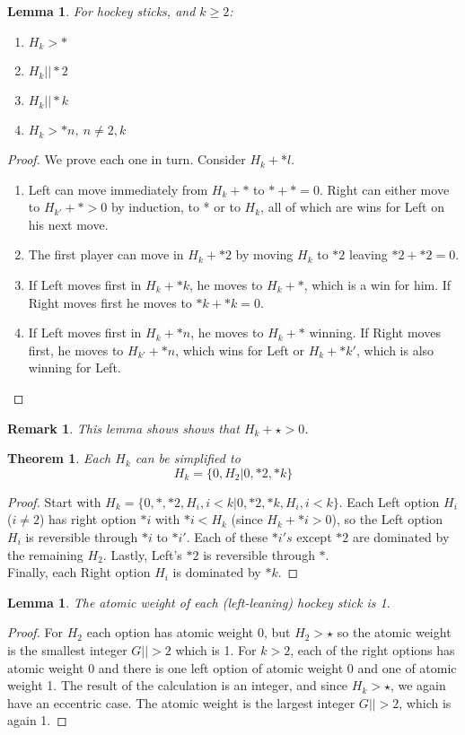 \documentclass{amsart}
\newtheorem{theorem}[definition]{Theorem}
\newtheorem{lemma}[definition]{Lemma}
\newtheorem{remark}[definition]{Remark}
\begin{document}
\begin{lemma}
\label{Lemma:Hkstar}
For hockey sticks, and $k\geq 2$:
\begin{enumerate}
\item $H_k>*$
\item $H_k||*2$
\item $H_k ||*k$
\item $H_k >*n,\ n\neq 2,k$
\end{enumerate}
\end{lemma}
\begin{proof}
We prove each one in turn.  Consider $H_k+*l$.
\begin{enumerate}
\item Left can move immediately from $H_k+*$ to $*+*=0$.  Right can either move to $H_{k'}+*>0$ by induction, to * or to $H_k$, all of which are wins for Left on his next move.
\item The first player can move in $H_k+*2$ by moving $H_k$ to $*2$ leaving $*2+*2=0$.
\item If Left moves first in $H_k+*k$, he moves to $H_k+*$, which is a win for him.  If Right moves first he moves to $*k+*k=0$.
\item If Left moves first in $H_k+*n$, he moves to $H_k+*$ winning.  If Right moves first, he moves to $H_{k'}+*n$, which wins for Left or $H_k+*k'$, which is also winning for Left.
\end{enumerate}
\end{proof}
\begin{remark}\label{remark:star} This lemma shows shows that $H_k+\star>0$.
\end{remark}

\begin{theorem}
Each $H_k$ can be simplified to
$$H_k=\{0,H_2|0,*2,*k\}$$
\end{theorem}
\begin{proof}
Start with $H_k=\{0,*,*2,H_i, i<k|0,*2,*k, H_i, i<k\}$.  Each Left option $H_i$ ($i\neq 2$) has right option $*i$ with $*i<H_k$ (since $H_k+*i>0$), so the Left option $H_i$ is reversible through $*i$ to $*i'$.  Each of these $*i's$ except $*2$ are dominated by the remaining $H_2$.  Lastly, Left's $*2$ is reversible through $*$.\\
Finally, each Right option $H_i$ is dominated by $*k$.
\end{proof}

\begin{lemma}
The atomic weight of each (left-leaning) hockey stick is 1.
\end{lemma}
\begin{proof}
For $H_2$ each option has atomic weight 0, but $H_2>\star$ so the atomic weight is the smallest integer $G||>2$ which is 1.  For $k>2$, each of the right options has atomic weight 0 and there is one left option of atomic weight 0 and one of atomic weight 1.  The result of the calculation is an integer, and since $H_k>\star$, we again have an eccentric case.  The atomic weight is the largest integer $G||>2$, which is again 1.
\end{proof}
\end{document}
